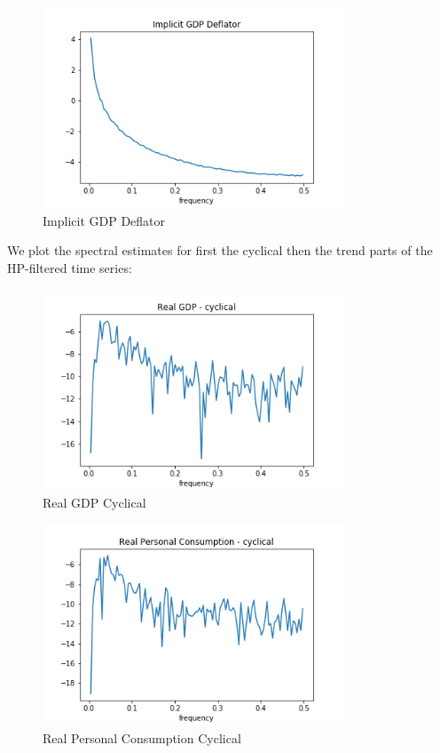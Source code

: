\documentclass[letterpaper,11pt]{article}
\theoremstyle{definition}
\begin{document}
\begin{spacing}{1.5}
\begin{Exercise}
				\begin{figure}[H]
					\caption{Implicit GDP Deflator}
					\label{fig:GDP_deflator}
					\includegraphics[width=0.8\textwidth]{Real_GDPD_Periodogram.png}
				\end{figure}
    \end{Exercise}

    \begin{Exercise} \label{Filter_HW_Periodograms_Filtered}
        We plot the spectral estimates for first the cyclical then the trend parts of the HP-filtered time series:

				\begin{figure}[H]
					\caption{Real GDP Cyclical}
					\label{fig:real_GDPcy}
					\includegraphics[width=0.8\textwidth]{Real_GDP_Cyclical.png}
				\end{figure}

				\begin{figure}[H]
					\caption{Real Personal Consumption Cyclical}
					\label{fig:real_PCcy}
					\includegraphics[width=0.8\textwidth]{Real_PC_Cyclical.png}
				\end{figure}


\end{Exercise}
\end{spacing}
\end{document}
